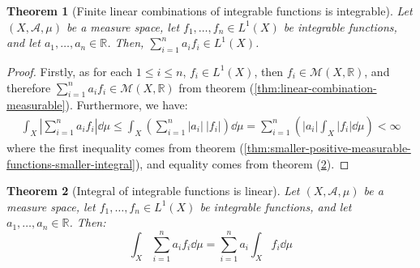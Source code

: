 \documentclass{article}
\newtheorem{theorem}{Theorem}[section]
\theoremstyle{definition}
\theoremstyle{remark}
\theoremstyle{example}
\theoremstyle{notation}
\theoremstyle{axiom}
\begin{document}
\begin{theorem}[Finite linear combinations of integrable functions is integrable] \label{thm:finite-linear-combination-is-integrable}
		Let $(X, \mathcal{A}, \mu)$ be a measure space, let $f_1, \dots, f_n \in L^1(X)$ be integrable functions, and let $a_1, \dots, a_n \in \mathbb{R}$. Then, $\sum_{i=1}^n a_i f_i \in L^1(X)$.
\end{theorem}

\begin{proof}
		Firstly, as for each $1 \leq i \leq n$, $f_i \in L^1(X)$, then $f_i \in \mathcal{M}(X, \mathbb{R})$, and therefore $\sum_{i=1}^n a_i f_i \in \mathcal{M}(X, \mathbb{R})$ from theorem (\ref{thm:linear-combination-measurable}). Furthermore, we have:
		\begin{align*}
				\int_X |\sum_{i=1}^n a_i f_i| \dd \mu \leq \int_X \left(\sum_{i=1}^n |a_i| ~ |f_i|\right) \dd \mu = \sum_{i=1}^n \left(|a_i| \int_X |f_i| \dd \mu\right) < \infty
		\end{align*}
		where the first inequality comes from theorem (\ref{thm:smaller-positive-measurable-functions-smaller-integral}), and equality comes from theorem (\ref{thm:integral-measurable-functions-linear}).
\end{proof}

\begin{theorem}[Integral of integrable functions is linear] \label{thm:integral-measurable-functions-linear}
		Let $(X, \mathcal{A}, \mu)$ be a measure space, let $f_1, \dots, f_n \in L^1(X)$ be integrable functions, and let $a_1, \dots, a_n \in \mathbb{R}$. Then:
				$$\int_X \sum_{i=1}^n a_i f_i \dd \mu = \sum_{i=1}^n a_i \int_X f_i \dd \mu$$
\end{theorem}
\end{document}
